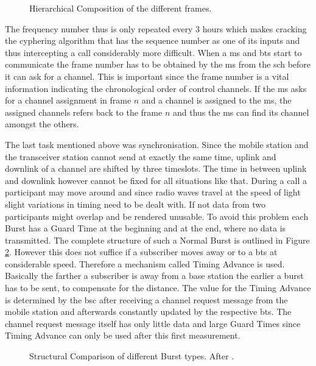\begin{figure}
	\centering
	\caption{Hierarchical Composition of the different frames.}
	\label{fig:frame_hierarchy}
\end{figure}

The frequency number thus is only repeated every 3 hours which makes cracking the cyphering algorithm that has the sequence number as one of its inputs and thus intercepting a call considerably  more difficult.
When a \gls{ms} and \gls{bts} start to communicate the frame number has to be obtained by the \gls{ms} from the \gls{sch} before it can ask for a channel.
This is important since the frame number is a vital information indicating the chronological order of control channels.
If the \gls{ms} asks for a channel assignment in frame $n$ and a channel is assigned to the \gls{ms}, the assigned channels refers back to the frame $n$ and thus the \gls{ms} can find its channel amongst the others.

The last task mentioned above was synchronisation.
Since the mobile station and the transceiver station cannot send at exactly the same time, uplink and downlink of a channel are shifted by three timeslots.
The time in between uplink and downlink however cannot be fixed for all situations like that.
During a call a participant may move around and since radio waves travel at the speed of light slight variations in timing need to be dealt with.
If not data from two participants might overlap and be rendered unusable.
To avoid this problem each Burst has a Guard Time at the beginning and at the end, where no data is transmitted.
The complete structure of such a Normal Burst is outlined in Figure \ref{fig:burst_types}.
However this does not suffice if a subscriber moves away or to a \gls{bts} at considerable speed.
Therefore a mechanism called Timing Advance is used.
Basically the farther a subscriber is away from a base station the earlier a burst has to be sent, to compensate for the distance.
The value for the Timing Advance is determined by the \gls{bsc} after receiving a channel request message from the mobile station and afterwards constantly updated by the respective \gls{bts}.
The channel request message itself has only little data and large Guard Times since Timing Advance can only be used after this first measurement.

\begin{figure}
	\centering
	\caption{Structural Comparison of different Burst types. After \cite{GSM2009}.}
	\label{fig:burst_types}
\end{figure}

